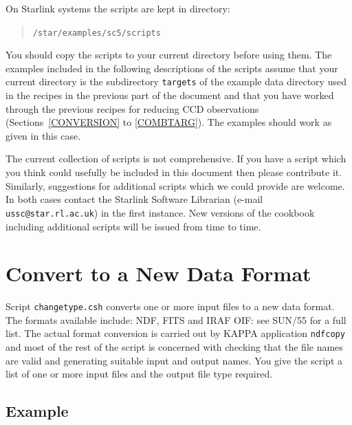 \documentclass[twoside,11pt]{article}
\newcommand{\xref}[3]{#1}
\newcommand{\xlabel}[1]{}
\begin{document}
On Starlink systems the scripts are kept in directory:

\begin{quote}
{\tt /star/examples/sc5/scripts}
\end{quote}

You should copy the scripts to your current directory before using them.
The examples included in the following descriptions of the scripts
assume that your current directory is the subdirectory {\tt targets}
of the example data directory used in the recipes in the previous part
of the document and that you have worked through the previous recipes
for reducing CCD observations (Sections~\ref{CONVERSION} to \ref{COMBTARG}).
The examples should work as given in this case.

The current collection of scripts is not comprehensive.  If you have a
script which you think could usefully be included in this document then
please contribute it.  Similarly, suggestions for additional scripts which
we could provide are welcome.  In both cases contact the Starlink Software
Librarian (e-mail {\tt ussc@star.rl.ac.uk}) in the first instance.  New
versions of the cookbook including additional scripts will be issued from
time to time.


\newpage
\section{\xlabel{CHANGETYPE}\label{CHANGETYPE}Convert to a New Data Format}

Script {\tt changetype.csh} converts one or more input files to a new
data format.  The formats available include: NDF, FITS and IRAF OIF:
see \xref{SUN/55}{sun55}{}\/\cite{SUN55} for a full list.  The actual
format conversion is carried out by \xref{KAPPA}{sun95}{} application
\xref{{\tt ndfcopy}}{sun95}{NDFCOPY} and most of the rest of the script is
concerned with checking that the file names are valid and generating
suitable input and output names.  You give the script a list of one or more
input files and the output file type required.  

\subsection*{Example}
\end{document}
